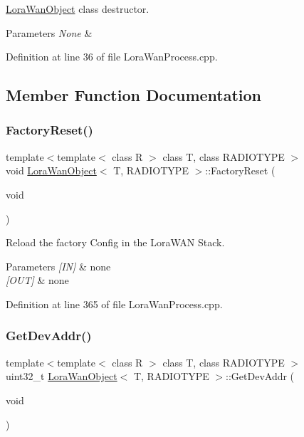 \mbox{\hyperlink{class_lora_wan_object}{Lora\+Wan\+Object}} class destructor. 


\begin{DoxyParams}{Parameters}
{\em None} & \\
\hline
\end{DoxyParams}


Definition at line 36 of file Lora\+Wan\+Process.\+cpp.



\subsection{Member Function Documentation}
\mbox{\label{class_lora_wan_object_ae3a51c4f4f4e9cbac50f65f77ad8b9cc}} 
\subsubsection{\texorpdfstring{Factory\+Reset()}{FactoryReset()}}
{\footnotesize\ttfamily template$<$template$<$ class R $>$ class T, class R\+A\+D\+I\+O\+T\+Y\+PE $>$ \\
void \mbox{\hyperlink{class_lora_wan_object}{Lora\+Wan\+Object}}$<$ T, R\+A\+D\+I\+O\+T\+Y\+PE $>$\+::Factory\+Reset (\begin{DoxyParamCaption}\item[{void}]{ }\end{DoxyParamCaption})}



Reload the factory Config in the Lora\+W\+AN Stack. 


\begin{DoxyParams}{Parameters}
{\em \mbox{[}\+I\+N\mbox{]}} & none \\
\hline
{\em \mbox{[}\+O\+U\+T\mbox{]}} & none \\
\hline
\end{DoxyParams}


Definition at line 365 of file Lora\+Wan\+Process.\+cpp.

\mbox{\label{class_lora_wan_object_ac6cb84ba9ccb3197382280abc72d453c}} 
\subsubsection{\texorpdfstring{Get\+Dev\+Addr()}{GetDevAddr()}}
{\footnotesize\ttfamily template$<$template$<$ class R $>$ class T, class R\+A\+D\+I\+O\+T\+Y\+PE $>$ \\
uint32\+\_\+t \mbox{\hyperlink{class_lora_wan_object}{Lora\+Wan\+Object}}$<$ T, R\+A\+D\+I\+O\+T\+Y\+PE $>$\+::Get\+Dev\+Addr (\begin{DoxyParamCaption}\item[{void}]{ }\end{DoxyParamCaption})}




